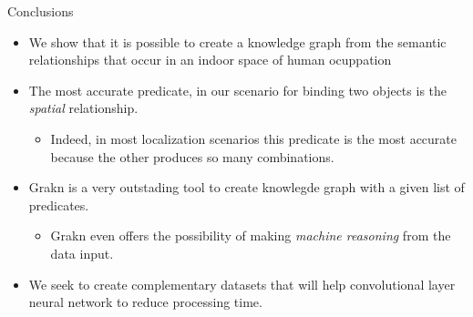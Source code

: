 \documentclass[aspectratio=169]{beamer}
\begin{document}
\begin{darkframes}
    \begin{frame}{Conclusions}
      \begin{itemize}
        \item We show that it is possible to create a knowledge graph from
        the semantic relationships that occur in an indoor space of human 
        ocuppation
        \item The most accurate predicate, in our scenario for binding two 
        objects is the \textit{spatial} relationship.
        \begin{itemize}
          \item Indeed, in most localization scenarios this predicate is the most
          accurate because the other produces so many combinations.
        \end{itemize}
        \item Grakn is a very outstading tool to create knowlegde graph with a 
        given list of predicates.
        \begin{itemize}
          \item Grakn even offers the possibility of making \textit{machine
          reasoning} from the data input.
        \end{itemize} 
        \item We seek to create complementary datasets that will help 
        convolutional layer neural network to reduce processing time.
      \end{itemize}
    \end{frame}   

  \end{darkframes}
\end{document}
